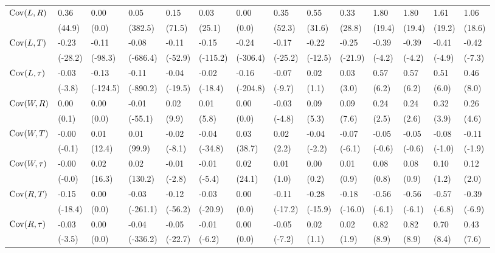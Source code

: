 {\begin{tabular}{@{}w{l}{6em}*{13}{w{c}{3em}}@{}}
    \quad $\mathrm{Cov}(L, R)$ & 0.36 & 0.00 & 0.05 & 0.15 & 0.03 & 0.00 & 0.35 & 0.55 & 0.33 & 1.80 & 1.80 & 1.61 & 1.06 \\
    & (44.9) & (0.0) & (382.5) & (71.5) & (25.1) & (0.0) & (52.3) & (31.6) & (28.8) & (19.4) & (19.4) & (19.2) & (18.6) \\
    \quad $\mathrm{Cov}(L, T)$ & -0.23 & -0.11 & -0.08 & -0.11 & -0.15 & -0.24 & -0.17 & -0.22 & -0.25 & -0.39 & -0.39 & -0.41 & -0.42 \\
    & (-28.2) & (-98.3) & (-686.4) & (-52.9) & (-115.2) & (-306.4) & (-25.2) & (-12.5) & (-21.9) & (-4.2) & (-4.2) & (-4.9) & (-7.3) \\
    \quad $\mathrm{Cov}(L, \tau)$ & -0.03 & -0.13 & -0.11 & -0.04 & -0.02 & -0.16 & -0.07 & 0.02 & 0.03 & 0.57 & 0.57 & 0.51 & 0.46 \\
    & (-3.8) & (-124.5) & (-890.2) & (-19.5) & (-18.4) & (-204.8) & (-9.7) & (1.1) & (3.0) & (6.2) & (6.2) & (6.0) & (8.0) \\
    \quad $\mathrm{Cov}(W, R)$ & 0.00 & 0.00 & -0.01 & 0.02 & 0.01 & 0.00 & -0.03 & 0.09 & 0.09 & 0.24 & 0.24 & 0.32 & 0.26 \\
    & (0.1) & (0.0) & (-55.1) & (9.9) & (5.8) & (0.0) & (-4.8) & (5.3) & (7.6) & (2.5) & (2.6) & (3.9) & (4.6) \\
    \quad $\mathrm{Cov}(W, T)$ & -0.00 & 0.01 & 0.01 & -0.02 & -0.04 & 0.03 & 0.02 & -0.04 & -0.07 & -0.05 & -0.05 & -0.08 & -0.11 \\
    & (-0.1) & (12.4) & (99.9) & (-8.1) & (-34.8) & (38.7) & (2.2) & (-2.2) & (-6.1) & (-0.6) & (-0.6) & (-1.0) & (-1.9) \\
    \quad $\mathrm{Cov}(W, \tau)$ & -0.00 & 0.02 & 0.02 & -0.01 & -0.01 & 0.02 & 0.01 & 0.00 & 0.01 & 0.08 & 0.08 & 0.10 & 0.12 \\
    & (-0.0) & (16.3) & (130.2) & (-2.8) & (-5.4) & (24.1) & (1.0) & (0.2) & (0.9) & (0.8) & (0.9) & (1.2) & (2.0) \\
    \quad $\mathrm{Cov}(R, T)$ & -0.15 & 0.00 & -0.03 & -0.12 & -0.03 & 0.00 & -0.11 & -0.28 & -0.18 & -0.56 & -0.56 & -0.57 & -0.39 \\
    & (-18.4) & (0.0) & (-261.1) & (-56.2) & (-20.9) & (0.0) & (-17.2) & (-15.9) & (-16.0) & (-6.1) & (-6.1) & (-6.8) & (-6.9) \\
    \quad $\mathrm{Cov}(R, \tau)$ & -0.03 & 0.00 & -0.04 & -0.05 & -0.01 & 0.00 & -0.05 & 0.02 & 0.02 & 0.82 & 0.82 & 0.70 & 0.43 \\
    & (-3.5) & (0.0) & (-336.2) & (-22.7) & (-6.2) & (0.0) & (-7.2) & (1.1) & (1.9) & (8.9) & (8.9) & (8.4) & (7.6) \\

\end{tabular}}
